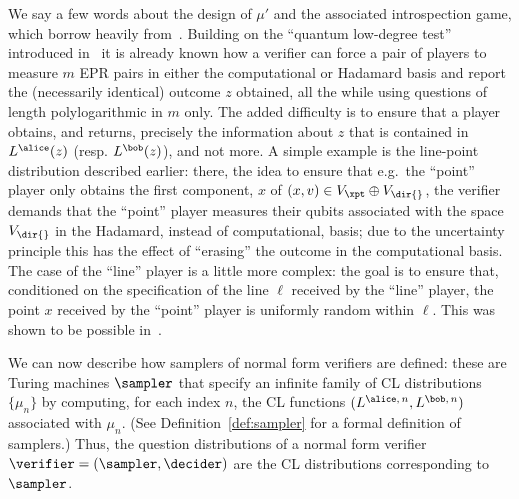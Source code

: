 We say a few words about the design of $\mu'$ and the associated introspection game, which borrow heavily from~\cite{NW19}. Building on the ``quantum low-degree test'' introduced in~\cite{natarajan2018low} it is already known how a verifier can force a pair of players to measure $m$ EPR pairs in either the computational or Hadamard basis and report the (necessarily identical) outcome $z$ obtained, all the while using questions of length polylogarithmic in $m$ only. The added difficulty is to ensure that a player obtains, and returns, precisely the information about $z$ that is contained in $L^\alice(z)$ (resp. $L^\bob(z)$), and not more. A simple example is the line-point distribution described earlier: there, the idea to ensure that e.g.\ the ``point'' player only obtains the first component, $x$ of $(x,v) \in V_\xpt \oplus V_{\dir{}}$, the verifier demands that the ``point'' player measures their qubits associated with the space $V_{\dir{}}$ in the Hadamard, instead of computational, basis; due to the uncertainty principle this has the effect of ``erasing'' the outcome in the computational basis.  The case of the ``line'' player is a little more complex: the goal is to ensure that, conditioned on the specification of the line $\ell$ received by the ``line'' player, the point $x$ received by the ``point'' player is uniformly random within $\ell$. This was shown to be possible in~\cite{NW19}.

We can now describe how samplers of normal form verifiers are defined: these are
Turing machines $\sampler$ that specify an infinite family of CL distributions
$\{ \mu_n \}$ by computing, for each index $n$, 
the CL functions $(L^{\alice,\, n},L^{\bob,\, n})$ associated with $\mu_n$. 
(See Definition~\ref{def:sampler} for a formal definition of samplers.)
Thus, the question distributions of a normal form verifier $\verifier =
(\sampler,\decider)$ are the CL distributions corresponding to $\sampler$.

    
    

